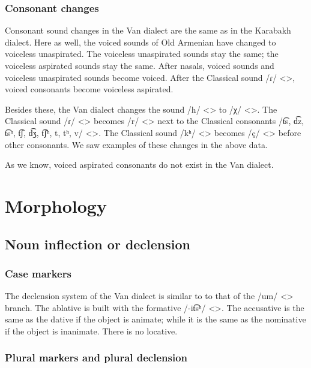 \subsubsection{Consonant changes}

Consonant sound changes in the Van dialect are the same as in the Karabakh dialect. Here as well, the voiced sounds of Old Armenian have changed to voiceless unaspirated. The voiceless unaspirated sounds stay the same; the voiceless aspirated sounds stay the same. After nasals, voiced sounds and voiceless unaspirated sounds become voiced. After the Classical sound /ɾ/ <>, voiced consonants become voiceless aspirated. 

Besides these, the Van dialect changes the sound /h/ <> to /χ/ <>. The Classical sound /ɾ/ <>   becomes /r/ <> next to the Classical consonants    /t͡s, d͡z, t͡sʰ, t͡ʃ, d͡ʒ, t͡ʃʰ, t, tʰ, v/ <>. The Classical sound /kʰ/ <> becomes /ç/ <> before other consonants. We saw examples of these changes in the above data. 


\begin{adjarianpage}\label{page:143}\end{adjarianpage}%

As we know, voiced aspirated consonants do not exist in the Van dialect. 

\section{Morphology}
\subsection{Noun inflection or declension}

\subsubsection{Case markers}
The declension system of the Van dialect is similar to to that of the /um/ <> branch. The ablative is built with the formative /-it͡sʰ/ <>. The accusative is the same as the dative if the object is animate; while it is the same as the nominative if the object is inanimate. There is no locative. 

\subsubsection{Plural markers and plural declension}

